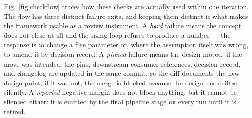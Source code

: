 Fig.~\ref{fig:checkflow} traces how these checks are actually used
within one iteration. The flow has three distinct failure exits, and
keeping them distinct is what makes the framework usable as a review
instrument. A \emph{hard} failure means the concept does not close at
all and the sizing loop refuses to produce a number --- the response is
to change a free parameter or, where the assumption itself was wrong,
to amend it by decision record. A \emph{pinned} failure means the
design moved: if the move was intended, the pins, downstream consumer
references, decision record, and changelog are updated in the same
commit, so the diff documents the new design point; if it was not, the
merge is blocked because the design has drifted silently. A
\emph{reported} negative margin does not block anything, but it cannot
be silenced either: it is emitted by the final pipeline stage on every
run until it is retired.

